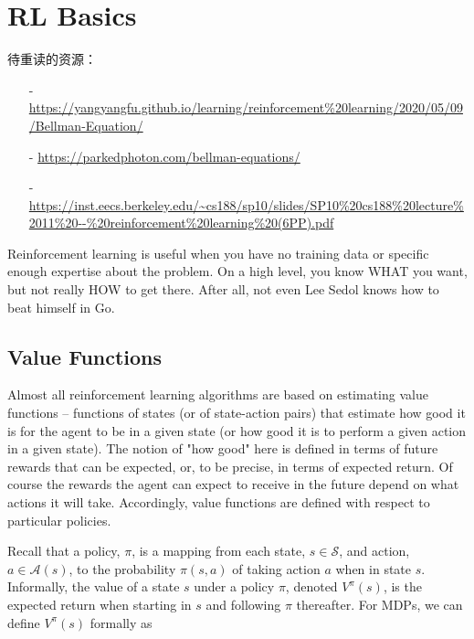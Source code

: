 
\chapter{RL Basics}\label{rl_basics}
待重读的资源：
\begin{itemize}
\setlength{\parskip}{0pt}
\item[-]
\url{https://yangyangfu.github.io/learning/reinforcement%20learning/2020/05/09/Bellman-Equation/}

\item[-]
\url{https://parkedphoton.com/bellman-equations/}

\item[-]
\url{https://inst.eecs.berkeley.edu/~cs188/sp10/slides/SP10%20cs188%20lecture%2011%20--%20reinforcement%20learning%20(6PP).pdf}
\end{itemize}


Reinforcement learning is useful when you have no training data or specific enough 
expertise about the problem. On a high level, you know WHAT you want, but not really 
HOW to get there. After all, not even Lee Sedol knows how to beat himself in Go.



\section{Value Functions}

Almost all reinforcement learning algorithms are based on estimating value functions 
-- functions of states (or of state-action pairs) that estimate how good it is for 
the agent to be in a given state (or how good it is to perform a given action in a 
given state). The notion of "how good" here is defined in terms of future rewards 
that can be expected, or, to be precise, in terms of expected return. Of course the 
rewards the agent can expect to receive in the future depend on what actions it will 
take. Accordingly, value functions are defined with respect to particular policies.

Recall that a policy, $\pi$, is a mapping from each state, $s\in\mathcal{S}$, and 
action, $a\in\mathcal{A}(s)$, to the probability $\pi(s,a)$ of taking action $a$ 
when in state $s$. Informally, the value of a state $s$ under a policy $\pi$, denoted 
$V^\pi(s)$, is the expected return when starting in $s$ and following $\pi$ thereafter. 
For MDPs, we can define $V^\pi(s)$ formally as

